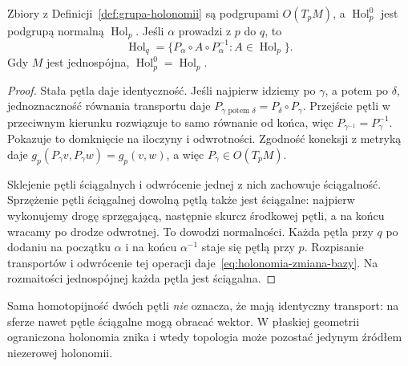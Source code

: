 \begin{stwierdzenie}
\label{prop:holonomia-grupa-baza}
Zbiory z Definicji~\ref{def:grupa-holonomii} są podgrupami
$O(T_pM)$, a $\operatorname{Hol}^0_p$ jest podgrupą
normalną $\operatorname{Hol}_p$. Jeśli $\alpha$ prowadzi
z $p$ do $q$, to
\begin{equation}\label{eq:holonomia-zmiana-bazy}
 \operatorname{Hol}_q=
 \{P_\alpha\circ A\circ P_\alpha^{-1}:A\in\operatorname{Hol}_p\}.
\end{equation}
Gdy $M$ jest jednospójna, $\operatorname{Hol}^0_p=
\operatorname{Hol}_p$.
\end{stwierdzenie}
\begin{proof}
Stała pętla daje identyczność. Jeśli najpierw idziemy po
$\gamma$, a potem po $\delta$, jednoznaczność równania
transportu daje $P_{\gamma\text{ potem }\delta}
=P_\delta\circ P_\gamma$. Przejście pętli w przeciwnym kierunku
rozwiązuje to samo równanie od końca, więc
$P_{\gamma^{-1}}=P_\gamma^{-1}$. Pokazuje to domknięcie
na iloczyny i odwrotności. Zgodność koneksji z metryką
daje $g_p(P_\gamma v,P_\gamma w)=g_p(v,w)$, a więc
$P_\gamma\in O(T_pM)$.

Sklejenie pętli ściągalnych i odwrócenie jednej z nich
zachowuje ściągalność. Sprzężenie pętli ściągalnej
dowolną pętlą także jest ściągalne: najpierw wykonujemy
drogę sprzęgającą, następnie skurcz środkowej pętli,
a na końcu wracamy po drodze odwrotnej. To dowodzi
normalności. Każda pętla przy $q$ po dodaniu na początku
$\alpha$ i na końcu $\alpha^{-1}$ staje się pętlą
przy $p$. Rozpisanie transportów i odwrócenie tej
operacji daje~\eqref{eq:holonomia-zmiana-bazy}.
Na rozmaitości jednospójnej każda pętla jest ściągalna.
\end{proof}

Sama homotopijność dwóch pętli \emph{nie} oznacza, że
mają identyczny transport: na sferze nawet pętle
ściągalne mogą obracać wektor. W płaskiej geometrii
ograniczona holonomia znika i wtedy topologia może
pozostać jedynym źródłem niezerowej holonomii.

